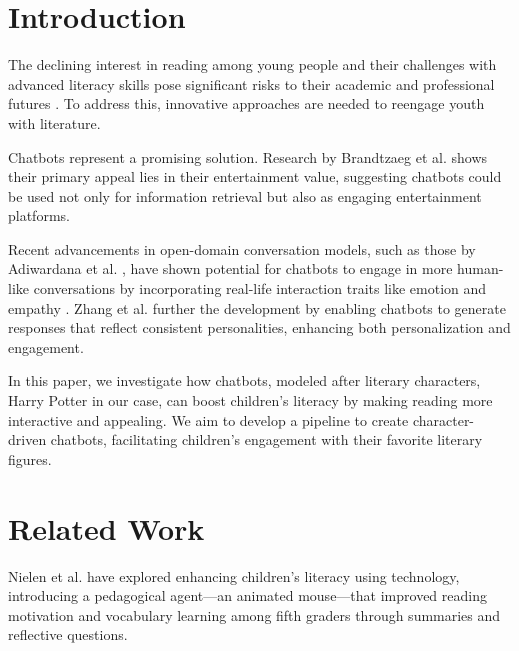 \documentclass[fleqn,moreauthors,10pt]{ds_report}
\affiliation{\textit{Advisors: Slavko Žitnik}}
\begin{document}
\flushbottom 

\maketitle 


\section*{Introduction}

The declining interest in reading among young people and their challenges with advanced literacy skills pose significant risks to their academic and professional futures \cite{murray2021literacy}. To address this, innovative approaches are needed to reengage youth with literature.

Chatbots represent a promising solution. Research by Brandtzaeg et al. \cite{why_chatbots} shows their primary appeal lies in their entertainment value, suggesting chatbots could be used not only for information retrieval but also as engaging entertainment platforms.

Recent advancements in open-domain conversation models, such as those by Adiwardana et al. \cite{adiwardana2020towards}, have shown potential for chatbots to engage in more human-like conversations by incorporating real-life interaction traits like emotion \cite{zhou2018emotional} and empathy \cite{rashkin2018towards_empathy}. Zhang et al. \cite{zhang2018personalizing} further the development by enabling chatbots to generate responses that reflect consistent personalities, enhancing both personalization and engagement.

In this paper, we investigate how chatbots, modeled after literary characters, Harry Potter in our case, can boost children's literacy by making reading more interactive and appealing. We aim to develop a pipeline to create character-driven chatbots, facilitating children's engagement with their favorite literary figures.

\section*{Related Work}
Nielen et al. \cite{nielen2018digital} have explored enhancing children's literacy using technology, introducing a pedagogical agent—an animated mouse—that improved reading motivation and vocabulary learning among fifth graders through summaries and reflective questions.
\end{document}
